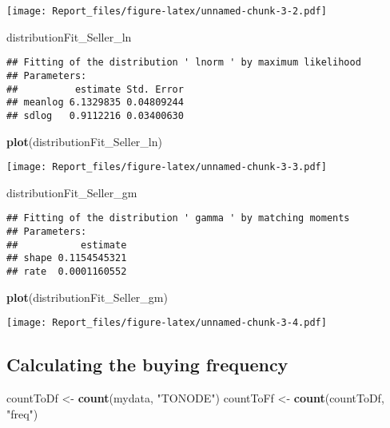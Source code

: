 \documentclass[]{article}
\newenvironment{Shaded}{\begin{snugshade}}{\end{snugshade}}
\newcommand{\KeywordTok}[1]{\textcolor[rgb]{0.13,0.29,0.53}{\textbf{#1}}}
\newcommand{\StringTok}[1]{\textcolor[rgb]{0.31,0.60,0.02}{#1}}
\newcommand{\NormalTok}[1]{#1}
\begin{document}
\texttt{[image: Report\_files/figure-latex/unnamed-chunk-3-2.pdf]}

\begin{Shaded}
\begin{Highlighting}[]
\NormalTok{distributionFit_Seller_ln}
\end{Highlighting}
\end{Shaded}

\begin{verbatim}
## Fitting of the distribution ' lnorm ' by maximum likelihood 
## Parameters:
##          estimate Std. Error
## meanlog 6.1329835 0.04809244
## sdlog   0.9112216 0.03400630
\end{verbatim}

\begin{Shaded}
\begin{Highlighting}[]
\KeywordTok{plot}\NormalTok{(distributionFit_Seller_ln)}
\end{Highlighting}
\end{Shaded}

\texttt{[image: Report\_files/figure-latex/unnamed-chunk-3-3.pdf]}

\begin{Shaded}
\begin{Highlighting}[]
\NormalTok{distributionFit_Seller_gm}
\end{Highlighting}
\end{Shaded}

\begin{verbatim}
## Fitting of the distribution ' gamma ' by matching moments 
## Parameters:
##           estimate
## shape 0.1154545321
## rate  0.0001160552
\end{verbatim}

\begin{Shaded}
\begin{Highlighting}[]
\KeywordTok{plot}\NormalTok{(distributionFit_Seller_gm)}
\end{Highlighting}
\end{Shaded}

\texttt{[image: Report\_files/figure-latex/unnamed-chunk-3-4.pdf]}

\subsection{Calculating the buying
frequency}\label{calculating-the-buying-frequency}

\begin{Shaded}
\begin{Highlighting}[]
\NormalTok{countToDf <-}\StringTok{ }\KeywordTok{count}\NormalTok{(mydata, }\StringTok{"TONODE"}\NormalTok{)}
\NormalTok{countToFf <-}\StringTok{ }\KeywordTok{count}\NormalTok{(countToDf, }\StringTok{"freq"}\NormalTok{)}
\end{Highlighting}
\end{Shaded}
\end{document}
